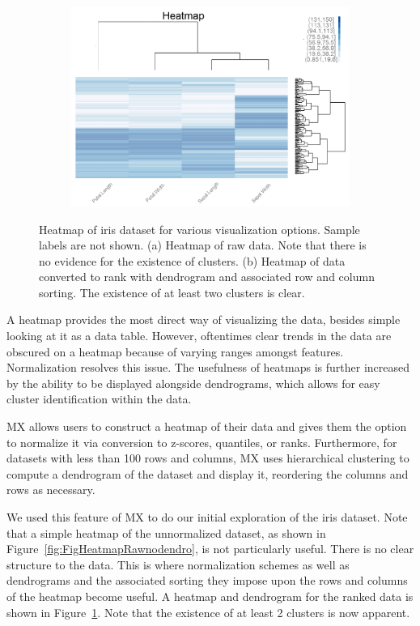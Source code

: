 \documentclass[review]{siamart0516}
\begin{document}
\begin{figure}[t!]
\begin{subfigure}[t]{0.46\textwidth}
		\includegraphics[width=\textwidth,valign=t]{Figures/Iris/HeatmapRanksDendro.png}
		\subcaption{}
		\label{fig:FigHeatmapRanksdendro}
	\end{subfigure}
	\vspace{-1.5\baselineskip}
	\caption{Heatmap of iris dataset for various visualization options. Sample labels are not shown. (a) Heatmap of raw data. Note that there is no evidence for the existence of clusters. (b) Heatmap of data converted to rank with dendrogram and associated row and column sorting. The existence of at least two clusters is clear.}
	\label{fig:FigHeatmap}
\end{figure}

A heatmap provides the most direct way of visualizing the data, besides simple looking at it as a data table. However, oftentimes clear trends in the data are obscured on a heatmap because of varying ranges amongst features. Normalization resolves this issue. The usefulness of heatmaps is further increased by the ability to be displayed alongside dendrograms, which allows for easy cluster identification within the data.

MX allows users to construct a heatmap of their data and gives them the option to normalize it via conversion to z-scores, quantiles, or ranks. Furthermore, for datasets with less than 100 rows and columns, MX uses hierarchical clustering to compute a dendrogram of the dataset and display it, reordering the columns and rows as necessary. 

We used this feature of MX to do our initial exploration of the iris dataset. Note that a simple heatmap of the unnormalized dataset, as shown in Figure~\ref{fig:FigHeatmapRawnodendro}, is not particularly useful. There is no clear structure to the data. This is where normalization schemes as well as dendrograms and the associated sorting they impose upon the rows and columns of the heatmap become useful. A heatmap and dendrogram for the ranked data is shown in Figure~\ref{fig:FigHeatmapRanksdendro}. Note that the existence of at least 2 clusters is now apparent.
\end{document}
